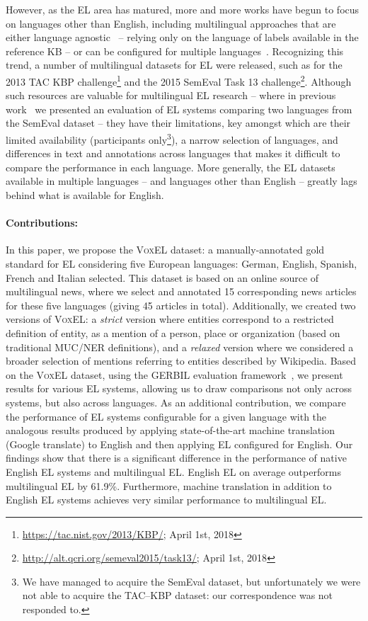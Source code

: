\documentclass{llncs}
\begin{document}
However, as the EL area has matured, more and more works have begun to focus on languages other than English, including multilingual approaches that are either language agnostic~\cite{THD-dojchinovski2012recognizing,daiber2013improving,ferragina2010tagme,mag2017} -- relying only on the language of labels available in the reference KB -- or can be configured for multiple languages~\cite{Babelfy-moro2014entity,freme-ner2016}. Recognizing this trend, a number of multilingual datasets for EL were released, such as for the 2013 TAC KBP challenge\footnote{\url{https://tac.nist.gov/2013/KBP/}; April 1st, 2018} %
and the 2015 SemEval Task 13 challenge\footnote{\url{http://alt.qcri.org/semeval2015/task13/}; April 1st, 2018}. Although such resources are valuable for multilingual EL research -- where in previous work~\cite{Rosales-MendezP17} we presented an evaluation of EL systems comparing two languages from the SemEval dataset -- they have their limitations, key amongst which are their limited availability (participants only\footnote{We have managed to acquire the SemEval dataset, but unfortunately we were not able to acquire the TAC--KBP dataset: our correspondence was not responded to.}), a narrow selection of languages, and differences in text and annotations across languages that makes it difficult to compare the performance in each language. More generally, the EL datasets available in multiple languages -- and languages other than English -- greatly lags behind what is available for English.

\paragraph{Contributions:} In this paper, we propose the \textsc{VoxEL} dataset: a manually-annotated gold standard for EL considering five European languages: German, English, Spanish, French and Italian selected. This dataset is based on an online source of multilingual news, where we select and annotated 15 corresponding news articles for these five languages (giving 45 articles in total). Additionally, we created two versions of \textsc{VoxEL}: a \textit{strict} version where entities correspond to a restricted definition of entity, as a mention of a person, place or organization (based on traditional MUC/NER definitions), and a \textit{relaxed} version where we considered a broader selection of mentions referring to entities described by Wikipedia. Based on the \textsc{VoxEL} dataset, using the GERBIL evaluation framework~\cite{gerbil-2015}, we present results for various EL systems, allowing us to draw comparisons not only across systems, but also across languages. As an additional contribution, we compare the performance of EL systems configurable for a given language with the analogous results produced by applying state-of-the-art machine translation (Google translate) to English and then applying EL configured for English. Our findings show that there is a significant difference in the performance of native English EL systems and multilingual EL. English EL on average outperforms multilingual EL by 61.9\%. Furthermore, machine translation in addition to English EL systems achieves very similar performance to multilingual EL. 
\end{document}
